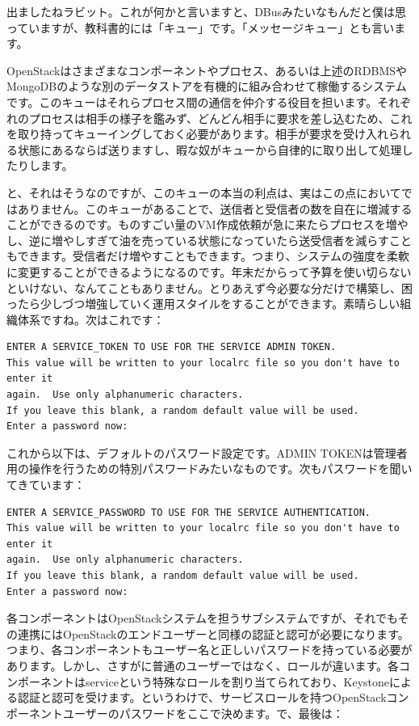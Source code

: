 \documentclass[9pt,b5paper,tombo,openany,dvipdfmx]{jsbook}
\begin{document}
出ましたねラビット。これが何かと言いますと、DBusみたいなもんだと僕は思っていますが、教科書的には「キュー」です。「メッセージキュー」とも言います。

OpenStackはさまざまなコンポーネントやプロセス、あるいは上述のRDBMSやMongoDBのような別のデータストアを有機的に組み合わせて稼働するシステムです。このキューはそれらプロセス間の通信を仲介する役目を担います。それぞれのプロセスは相手の様子を鑑みず、どんどん相手に要求を差し込むため、これを取り持ってキューイングしておく必要があります。相手が要求を受け入れられる状態にあるならば送りますし、暇な奴がキューから自律的に取り出して処理したりします。

と、それはそうなのですが、このキューの本当の利点は、実はこの点においてではありません。このキューがあることで、送信者と受信者の数を自在に増減することができるのです。ものすごい量のVM作成依頼が急に来たらプロセスを増やし、逆に増やしすぎて油を売っている状態になっていたら送受信者を減らすこともできます。受信者だけ増やすこともできます。つまり、システムの強度を柔軟に変更することができるようになるのです。年末だからって予算を使い切らないといけない、なんてこともありません。とりあえず今必要な分だけで構築し、困ったら少しづつ増強していく運用スタイルをすることができます。素晴らしい組織体系ですね。次はこれです：

\begin{lstlisting}
ENTER A SERVICE_TOKEN TO USE FOR THE SERVICE ADMIN TOKEN.
This value will be written to your localrc file so you don't have to enter it
again.  Use only alphanumeric characters.
If you leave this blank, a random default value will be used.
Enter a password now:
\end{lstlisting}

これから以下は、デフォルトのパスワード設定です。ADMIN TOKENは管理者用の操作を行うための特別パスワードみたいなものです。次もパスワードを聞いてきています：

\begin{lstlisting}
ENTER A SERVICE_PASSWORD TO USE FOR THE SERVICE AUTHENTICATION.
This value will be written to your localrc file so you don't have to enter it
again.  Use only alphanumeric characters.
If you leave this blank, a random default value will be used.
Enter a password now:
\end{lstlisting}

各コンポーネントはOpenStackシステムを担うサブシステムですが、それでもその連携にはOpenStackのエンドユーザーと同様の認証と認可が必要になります。つまり、各コンポーネントもユーザー名と正しいパスワードを持っている必要があります。しかし、さすがに普通のユーザーではなく、ロールが違います。各コンポーネントはserviceという特殊なロールを割り当てられており、Keystoneによる認証と認可を受けます。というわけで、サービスロールを持つOpenStackコンポーネントユーザーのパスワードをここで決めます。で、最後は：
\end{document}
